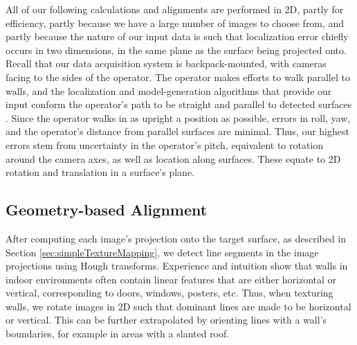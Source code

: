 \documentclass[]{spie}  %
\begin{document}
{All of our following calculations and alignments are performed in 2D,
partly for efficiency, partly because we have a large number of images
to choose from, and partly because the nature of our input data is
such that localization error chiefly occurs in two dimensions, in the
same plane as the surface being projected onto. Recall that our data
acquisition system is backpack-mounted, with cameras facing to the
sides of the operator. The operator makes efforts to walk parallel to
walls, and the localization and model-generation algorithms that
provide our input conform the operator's path to be straight and
parallel to detected surfaces \cite{kua2012loopclosure,
  sanchez2012point}. Since the operator walks in as upright a position
as possible, errors in roll, yaw, and the operator's distance from
parallel surfaces are minimal. Thus, our highest errors stem from
uncertainty in the operator's pitch, equivalent to rotation around the
camera axes, as well as location along surfaces. These equate to 2D
rotation and translation in a surface's plane.

\subsection{Geometry-based Alignment}
\label{sec:geometryAlignment}
After computing each image's projection onto the target surface, as
described in Section \ref{sec:simpleTextureMapping}, we detect line
segments in the image projections using Hough transforms. Experience
and intuition show that walls in indoor environments often contain
linear features that are either horizontal or vertical, corresponding
to doors, windows, posters, etc. Thus, when texturing walls, we rotate
images in 2D such that dominant lines are made to be horizontal or
vertical. This can be further extrapolated by orienting lines with a
wall's boundaries, for example in areas with a slanted roof.

}
\end{document}
